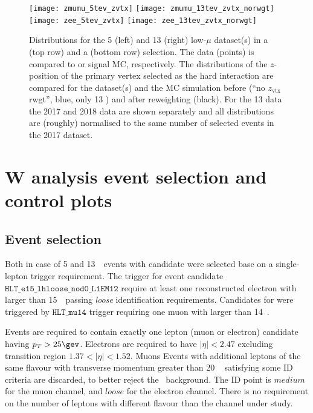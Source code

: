 \begin{figure}[tph]
	\centering
	\texttt{[image: zmumu\_5tev\_zvtx]}%
	\texttt{[image: zmumu\_13tev\_zvtx\_norwgt]}
	\texttt{[image: zee\_5tev\_zvtx]}%
	\texttt{[image: zee\_13tev\_zvtx\_norwgt]}
	\caption{Distributions for the 5 \TeV{} (left) and 13 \TeV{} (right)
		low-$\mu$ dataset(s) in a \Zgmm (top row) and a \Zgee (bottom row)
		selection. The data (points) is compared to \Zgmm or \Zgee signal
		MC, respectively. The distributions of the $z$-position of the
		primary vertex selected as the hard interaction are compared for
		the dataset(s) and the MC simulation before (``no $z_\mathrm{vtx}$
		rwgt'', blue, only 13 \TeV{}) and after reweighting (black). For
		the 13 \TeV{} data the 2017 and 2018 data are shown separately and
		all distributions are (roughly) normalised to the same number of
		selected events in the 2017 dataset. }
	\label{fig:zvtx}
\end{figure}
\section{W analysis event selection and control plots}
\label{sec:selection}

\subsection{Event selection}
\label{subsec:wselection}
Both in case of 5 and 13~\TeV\ events with \Wln{} candidate were selected base on a single-lepton trigger requirement.
The trigger for \Wen event candidate $\texttt{HLT\_e15\_lhloose\_nod0\_L1EM12}$ require at least one reconstructed electron with \ET larger than 15~\GeV\ passing \emph{loose} identification requirements. Candidates for \Wmn were triggered by $\texttt{HLT\_mu14}$ trigger requiring one muon with \ET larger than 14~\GeV.

Events are required to contain exactly one lepton (muon or electron) candidate having $p_T > 25\gev$. Electrons are required to have $|\eta|<2.47$ excluding transition region $1.37 < |\eta|< 1.52$. Muons   
Events with additional leptons of the same flavour with transverse momentum greater than 20 ~\GeV{} satisfying some ID criteria are discarded, to better reject the \Zboson\ background. The ID point is $medium$ for the muon channel, and $loose$ for the electron channel. There is no requirement on the number of leptons with different flavour than the channel under study.

